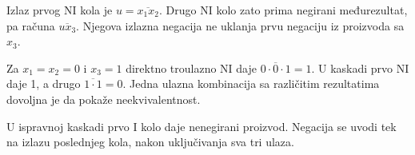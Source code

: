 
Izlaz prvog NI kola je \(u=\overline{x_1x_2}\). Drugo NI kolo zato prima negirani međurezultat, pa računa \(\overline{ux_3}\). Njegova izlazna negacija ne uklanja prvu negaciju iz proizvoda sa \(x_3\).

Za \(x_1=x_2=0\) i \(x_3=1\) direktno troulazno NI daje \(\overline{0\cdot0\cdot1}=1\). U kaskadi prvo NI daje 1, a drugo \(\overline{1\cdot1}=0\). Jedna ulazna kombinacija sa različitim rezultatima dovoljna je da pokaže neekvivalentnost.

U ispravnoj kaskadi prvo I kolo daje nenegirani proizvod. Negacija se uvodi tek na izlazu poslednjeg kola, nakon uključivanja sva tri ulaza.
